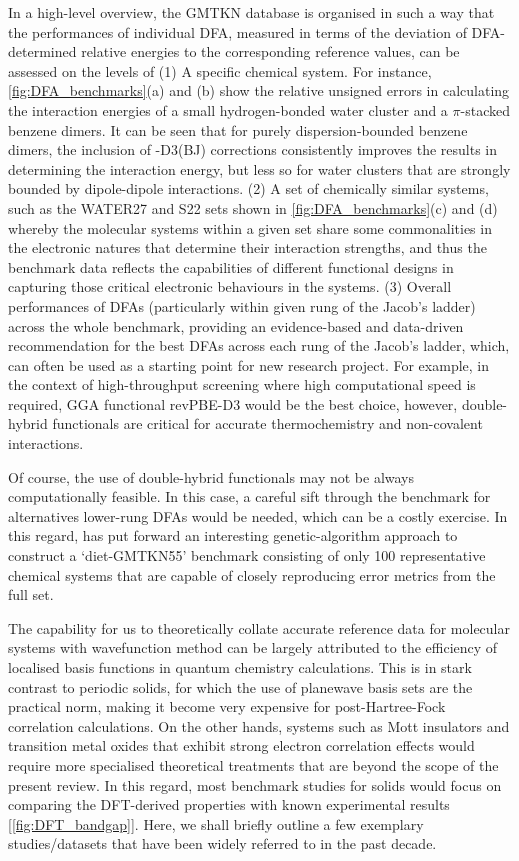 In a high-level overview, the GMTKN database is organised in such a way that the performances of individual DFA, measured in terms of the deviation of DFA-determined relative energies to the corresponding reference values, can be assessed on the levels of (1) A specific chemical system. For instance, \cref{fig:DFA_benchmarks}(a) and (b) show the relative unsigned errors in calculating the interaction energies of a small hydrogen-bonded water cluster and a $\pi$-stacked benzene dimers. It  can be seen that for purely dispersion-bounded benzene dimers, the inclusion of -D3(BJ) corrections consistently improves the results in determining the interaction energy, but less so for water clusters that are strongly bounded by dipole-dipole interactions. (2) A set of chemically similar systems, such as the WATER27 and S22 sets shown in \cref{fig:DFA_benchmarks}(c) and (d) whereby the molecular systems within a given set share some commonalities in the electronic natures that determine their interaction strengths, and thus the benchmark data reflects the capabilities of different functional designs in capturing those critical electronic behaviours in the systems. (3) Overall performances of DFAs (particularly within given rung of the Jacob's ladder) across the whole benchmark, providing an evidence-based and data-driven recommendation for the best DFAs across each rung of the Jacob's ladder, which, can often be used as a starting point for new research project. For example, in the context of high-throughput screening where high computational speed is required, GGA functional revPBE-D3\cite{zhang1998comment} would be the best choice, however, double-hybrid functionals are critical for accurate thermochemistry and non-covalent interactions. 

Of course, the use of double-hybrid functionals may not be always computationally feasible. In this case, a careful sift through the benchmark for alternatives lower-rung DFAs would be needed, which can be a costly exercise.  In this regard, \citet{gould2018diet} has put forward an interesting genetic-algorithm approach to construct a `diet-GMTKN55' benchmark consisting of only 100 representative chemical systems that are capable of closely reproducing error metrics from the full set. 

The capability for us to theoretically collate accurate reference data for molecular systems with wavefunction method can be largely attributed to the efficiency of localised basis functions in quantum chemistry calculations. This is in stark contrast to periodic solids, for which the use of planewave basis sets are the practical norm, making it become very expensive for post-Hartree-Fock correlation calculations. On the other hands, systems such as Mott insulators\cite{imada1998metal} and transition metal oxides\cite{tokura2003correlated} that exhibit strong electron correlation effects would require more specialised theoretical treatments\cite{georges2004strongly,imada2010electronic} that are beyond the scope of the present review. In this regard, most benchmark studies for solids would focus on comparing the DFT-derived properties with known experimental results [\cref{fig:DFT_bandgap}]. Here, we shall briefly outline a few exemplary studies/datasets that have been widely referred to in the past decade.

